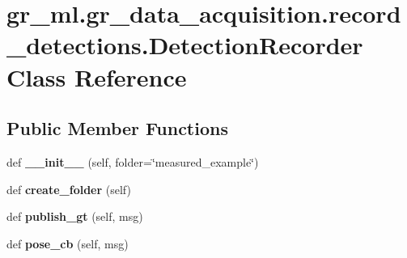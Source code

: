 \hypertarget{classgr__ml_1_1gr__data__acquisition_1_1record__detections_1_1DetectionRecorder}{}\section{gr\+\_\+ml.\+gr\+\_\+data\+\_\+acquisition.\+record\+\_\+detections.\+Detection\+Recorder Class Reference}
\label{classgr__ml_1_1gr__data__acquisition_1_1record__detections_1_1DetectionRecorder}
\subsection*{Public Member Functions}
\begin{DoxyCompactItemize}
\item 
\mbox{\label{classgr__ml_1_1gr__data__acquisition_1_1record__detections_1_1DetectionRecorder_ab8c7937d2abb7ceefa6260a3980f0a78}} 
def {\bfseries \+\_\+\+\_\+init\+\_\+\+\_\+} (self, folder=\char`\"{}measured\+\_\+example\char`\"{})
\item 
\mbox{\label{classgr__ml_1_1gr__data__acquisition_1_1record__detections_1_1DetectionRecorder_ab498b36ed59372aeeaddbe9c41b2d581}} 
def {\bfseries create\+\_\+folder} (self)
\item 
\mbox{\label{classgr__ml_1_1gr__data__acquisition_1_1record__detections_1_1DetectionRecorder_a4e34a6c3a980b1f45de91de892e1e562}} 
def {\bfseries publish\+\_\+gt} (self, msg)
\item 
\mbox{\label{classgr__ml_1_1gr__data__acquisition_1_1record__detections_1_1DetectionRecorder_a438b01df3a5187e17a68f45709a06f7d}} 
def {\bfseries pose\+\_\+cb} (self, msg)
\end{DoxyCompactItemize}

